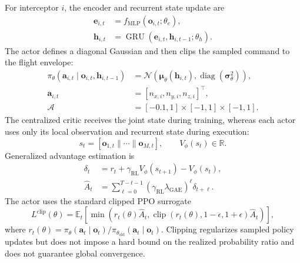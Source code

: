 \documentclass[lettersize,journal]{IEEEtran}
\begin{document}
{For interceptor \(i\), the encoder and recurrent state update are
\begin{align}
\mathbf{e}_{i,t}&=f_{\mathrm{MLP}}(\mathbf{o}_{i,t};\theta_e),\\
\mathbf{h}_{i,t}&=\operatorname{GRU}(\mathbf{e}_{i,t},
\mathbf{h}_{i,t-1};\theta_h).
\label{eq:rmapppo_gru}
\end{align}
The actor defines a diagonal Gaussian and then clips the sampled command to the
flight envelope:
\begin{align}
\pi_\theta(\mathbf{a}_{i,t}\mid\mathbf{o}_{i,t},\mathbf{h}_{i,t-1})
 &=\mathcal{N}\!\left(\boldsymbol{\mu}_\theta(\mathbf{h}_{i,t}),
 \operatorname{diag}(\boldsymbol{\sigma}_\theta^2)\right),\nonumber\\[-2pt]
\mathbf{a}_{i,t}&=[n_{x,i},n_{y,i},n_{z,i}]^\top,\nonumber\\
\mathcal A&=[-0.1,1]\times[-1,1]\times[-1,1].
\label{eq:action3d}
\end{align}
The centralized critic receives the joint state during training, whereas each
actor uses only its local observation and recurrent state during execution:
\begin{equation}
s_t=[\mathbf{o}_{1,t}\|\cdots\|\mathbf{o}_{M,t}],\qquad
V_\phi(s_t)\in\mathbb{R}.
\end{equation}
Generalized advantage estimation is
\begin{align}
\delta_t&=r_t+\gamma_{\mathrm{RL}}V_\phi(s_{t+1})-V_\phi(s_t),\\
\hat A_t&=\sum_{\ell=0}^{T-t-1}
(\gamma_{\mathrm{RL}}\lambda_{\mathrm{GAE}})^\ell\delta_{t+\ell}.
\end{align}
The actor uses the standard clipped PPO surrogate
\begin{equation}
L^{\mathrm{clip}}(\theta)=
\mathbb{E}_t\!\left[
\min\!\left(r_t(\theta)\hat A_t,
\operatorname{clip}(r_t(\theta),1-\epsilon,1+\epsilon)\hat A_t\right)
\right],
\end{equation}
where \(r_t(\theta)=\pi_\theta(\mathbf a_t\mid\mathbf o_t)/
\pi_{\theta_{\mathrm{old}}}(\mathbf a_t\mid\mathbf o_t)\).
Clipping regularizes sampled policy updates but does not impose a hard bound on
the realized probability ratio and does not guarantee global convergence.

}
\end{document}
